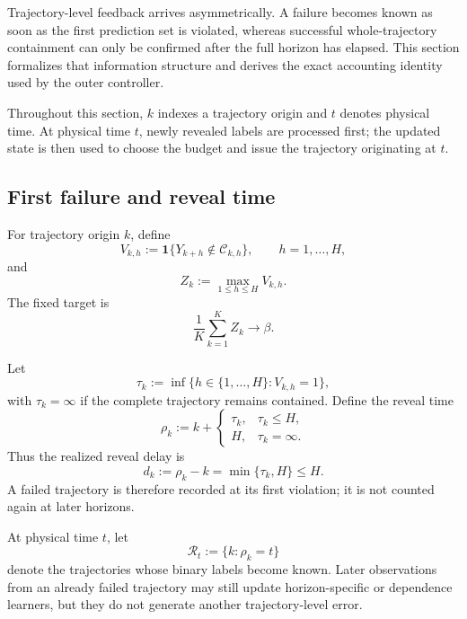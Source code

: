 \documentclass[11pt]{article}
\begin{document}
Trajectory-level feedback arrives asymmetrically.  A failure becomes known as
soon as the first prediction set is violated, whereas successful
whole-trajectory containment can only be confirmed after the full horizon has
elapsed.  This section formalizes that information structure and derives the
exact accounting identity used by the outer controller.

Throughout this section, $k$ indexes a trajectory origin and $t$ denotes
physical time.  At physical time $t$, newly revealed labels are processed first;
the updated state is then used to choose the budget and issue the trajectory
originating at $t$.

\subsection{First failure and reveal time}

For trajectory origin $k$, define
\begin{equation}
    V_{k,h}
    :=
    \mathbf 1\{Y_{k+h}\notin\mathcal C_{k,h}\},
    \qquad h=1,\ldots,H,
    \label{eq:horizon-violation}
\end{equation}
and
\begin{equation}
    Z_k
    :=
    \max_{1\le h\le H}V_{k,h}.
    \label{eq:trajectory-failure-feedback}
\end{equation}
The fixed target is
\[
    \frac1K\sum_{k=1}^K Z_k\longrightarrow\beta.
\]

Let
\[
    \tau_k
    :=
    \inf\{h\in\{1,\ldots,H\}:V_{k,h}=1\},
\]
with $\tau_k=\infty$ if the complete trajectory remains contained.  Define the
reveal time
\begin{equation}
    \rho_k
    :=
    k+
    \begin{cases}
        \tau_k, & \tau_k\le H,\\
        H, & \tau_k=\infty.
    \end{cases}
    \label{eq:reveal-time}
\end{equation}
Thus the realized reveal delay is
\[
    d_k:=\rho_k-k=\min\{\tau_k,H\}\le H.
\]
A failed trajectory is therefore recorded at its first violation; it is not
counted again at later horizons.

At physical time $t$, let
\begin{equation}
    \mathcal R_t
    :=
    \{k:\rho_k=t\}
    \label{eq:newly-resolved}
\end{equation}
denote the trajectories whose binary labels become known.  Later observations
from an already failed trajectory may still update horizon-specific or
dependence learners, but they do not generate another trajectory-level error.
\end{document}
